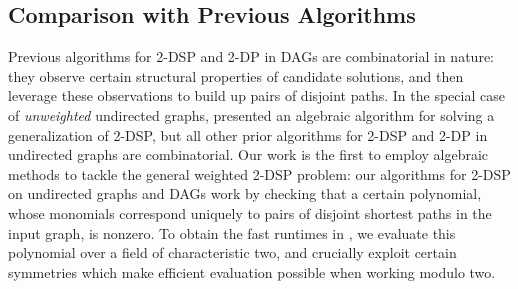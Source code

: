 \documentclass[11pt]{article}
\theoremstyle{definition}
\newcommand\nicole[1]{\textcolor{red}{Nicole says: #1}}
\begin{document}





\subsection{Comparison with Previous Algorithms}
\label{subsec:prev-alg}


Previous algorithms for \textsf{2-DSP} and \textsf{2-DP} in DAGs are combinatorial in nature: they observe certain structural properties of candidate solutions, and then leverage these observations to build up pairs of disjoint paths.
In the special case of \emph{unweighted} undirected graphs, \cite{BjorklundHusfeldtKaski2022} presented an algebraic algorithm for solving a generalization of \textsf{2-DSP}, but all other prior algorithms for \textsf{2-DSP} and \textsf{2-DP} in undirected graphs are combinatorial.
Our work is the first to employ algebraic methods to tackle the general weighted \textsf{2-DSP} problem: our algorithms for \textsf{2-DSP} on undirected graphs and DAGs work by checking that a certain polynomial, whose monomials correspond uniquely to pairs of disjoint shortest paths in the input graph, is nonzero. 
To obtain the fast runtimes in , we evaluate this polynomial over a field of characteristic two, and crucially exploit certain symmetries 
which make efficient evaluation possible when working modulo two.
\end{document}
